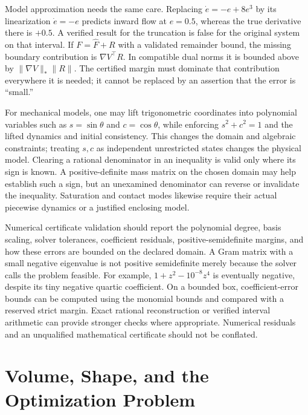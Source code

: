 \documentclass[12pt, openany]{book}
\theoremstyle{plain}
\begin{document}
Model approximation needs the same care. Replacing $\dot e=-e+8e^3$ by its linearization $\dot e=-e$ predicts inward flow at $e=0.5$, whereas the true derivative there is $+0.5$. A verified result for the truncation is false for the original system on that interval. If $F=\widehat F+R$ with a validated remainder bound, the missing boundary contribution is $\nabla V^\top R$. In compatible dual norms it is bounded above by $\|\nabla V\|_*\|R\|$. The certified margin must dominate that contribution everywhere it is needed; it cannot be replaced by an assertion that the error is ``small.''

For mechanical models, one may lift trigonometric coordinates into polynomial variables such as $s=\sin\theta$ and $c=\cos\theta$, while enforcing $s^2+c^2=1$ and the lifted dynamics and initial consistency. This changes the domain and algebraic constraints; treating $s,c$ as independent unrestricted states changes the physical model. Clearing a rational denominator in an inequality is valid only where its sign is known. A positive-definite mass matrix on the chosen domain may help establish such a sign, but an unexamined denominator can reverse or invalidate the inequality. Saturation and contact modes likewise require their actual piecewise dynamics or a justified enclosing model.

Numerical certificate validation should report the polynomial degree, basis scaling, solver tolerances, coefficient residuals, positive-semidefinite margins, and how these errors are bounded on the declared domain. A Gram matrix with a small negative eigenvalue is not positive semidefinite merely because the solver calls the problem feasible. For example, $1+z^2-10^{-8}z^4$ is eventually negative, despite its tiny negative quartic coefficient. On a bounded box, coefficient-error bounds can be computed using the monomial bounds and compared with a reserved strict margin. Exact rational reconstruction or verified interval arithmetic can provide stronger checks where appropriate. Numerical residuals and an unqualified mathematical certificate should not be conflated.

\section{Volume, Shape, and the Optimization Problem}
\end{document}
